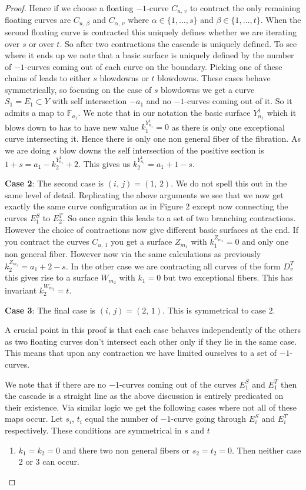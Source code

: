 \documentclass[12pt]{amsbook}
\theoremstyle{plain}
\newcommand{\mb}[1]{\mathbb{#1}}
\begin{document}
\begin{proof}
Hence if we choose a floating $-1$-curve $C_{u, \, v}$ to contract the only remaining floating curves are $C_{u, \, \beta}$ and $C_{\alpha , \, v}$ where $\alpha \in \{ 1, \dots, s\}$ and $\beta \in \{1 , \dots , t \}$. When the second floating curve is contracted this uniquely defines whether we are iterating over $s$ or over $t$. So after two contractions the cascade is uniquely defined. To see where it ends up we note that a basic surface is uniquely defined by the number of $-1$-curves coming out of each curve on the boundary. Picking one of these chains of  leads to either $s$ blowdowns or $t$ blowdowns. These cases behave symmetrically, so focusing on the case of $s$ blowdowns we get a curve $S_1 = E_1 \subset Y$ with self intersection $-a_1$ and no $-1$-curves coming out of it. So it admits a map to $\mb{F}_{a_1}$. We note that in our notation the basic surface $Y^1_{n_1}$ which it blows down to has to have new value $k^{Y^1_{n_1}}_1 = 0$ as there is only one exceptional curve intersecting it. Hence there is only one non general fiber of the fibration. As we are doing $s$ blow downs the self intersection of the positive section is $1 + s = a_1 - k^{Y^1_{n_1}}_2  + 2$. This gives us $k^{Y^1_{n_1}}_2  = a_1 + 1 - s$. 

\textbf{Case 2}: The second case is $(i, \, j) = (1, \, 2)$. We do not spell this out in the same level of detail. Replicating the above arguments we see that we now get exactly the same curve configuration as in Figure 2 except now connecting the curves $E_1^S$ to $E_2^T$. So once again this leads to a set of two branching contractions. However the choice of contractions now give different basic surfaces at the end. If you contract the curves $C_{u, \,1}$ you get a surface $Z_{m_1}$ with $k^{Z_{m_1}}_1 = 0$ and only one non general fiber. However now via the same calculations as previously $k^{Z_{m_1}}_2 = a_1 + 2 - s$. In the other case we are contracting all curves of the form $D^T_v$ this gives rise to a surface $W_{m_2}$ with $k_1 = 0$ but two exceptional fibers. This has invariant $k_2^{W_{m_2}} = t$. 

\textbf{Case 3}: The final case is $(i, \, j) = (2, \, 1)$. This is symmetrical to case 2.

A crucial point in this proof is that each case behaves independently of the others as two floating curves don't intersect each other only if they lie in the same case. This means that upon any contraction we have limited ourselves to a set of $-1$-curves.

We note that if there are no $-1$-curves coming out of the curves $E_1^S$ and $E_1^T$ then the cascade is a straight line as the above discussion is entirely predicated on their existence.
Via similar logic we get the following cases where not all of these maps occur. Let $s_i$, $t_i$ equal the number of $-1$-curve going through $E_i^S$ and $E_i^T$ respectively. These conditions are symmetrical in $s$ and $t$
\begin{enumerate}
\item $k_1 = k_2 = 0$ and there two non general fibers or $s_2 = t_2 = 0$. Then neither case 2 or 3 can occur.


\end{enumerate}
\end{proof}
\end{document}
